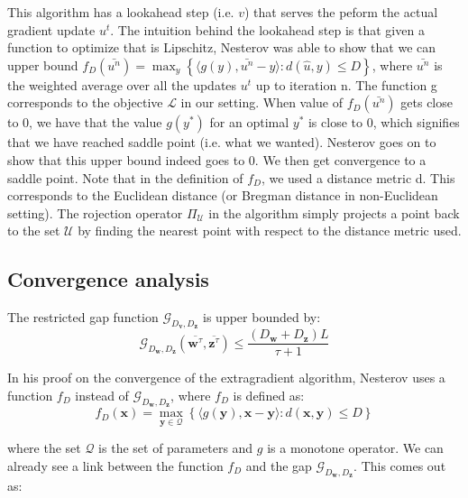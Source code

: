 \documentclass{article}
\renewcommand{\vec}{\mathbf}
\begin{document}
This algorithm has a lookahead step (i.e. $v$) that serves the peform the actual
gradient update $u^t$. The intuition behind the lookahead step is that given a
function to optimize that is Lipschitz, Nesterov was able to show that we can
upper bound $f_{D}(\bar{u^n}) = \max_y \left \{ \langle g(y),\bar{u^n} - y
\rangle : d(\hat{u},y) \leq D \right \}$, where $\bar{u^n}$ is the weighted
average over all the updates $u^t$ up to iteration n. The function g corresponds
to the objective $\mathcal{L}$ in our setting. When value of $f_D(\bar{u^n})$
gets close to 0, we have that the value $g(y^*)$ for an optimal $y^*$ is close
to 0, which signifies that we have reached saddle point (i.e. what we wanted).
Nesterov goes on to show that this upper bound indeed goes to 0. We then get
convergence to a saddle point. Note that in the definition of $f_D$, we used a
distance metric d. This corresponds to the Euclidean distance (or Bregman
distance in non-Euclidean setting). The rojection operator $\Pi_{\mathcal{U}}$
in the algorithm simply projects a point back to the set $\mathcal{U}$ by
finding the nearest point with respect to the distance metric used.

\subsection{Convergence analysis} The restricted gap function
$\mathcal{G}_{D_{\vec v}, D_{\vec z}}$ is upper bounded by:
\begin{equation} \mathcal{G}_{D_{\vec w}, D_{\vec z}}(\overline{\vec w^{\tau}},
\overline{\vec z^{\tau}}) \leq \frac{\left( D_{\vec w} + D_{\vec z} \right)
L}{\tau + 1}
\label{eq:ub}
\end{equation}

In his proof on the convergence of the extragradient algorithm, Nesterov uses a
function $f_D$ instead of $\mathcal{G}_{D_{\vec w}, D_{\vec z}}$, where $f_D$ is
defined as:
\begin{equation}
f_D(\vec x) = \max_{\vec y \in \mathcal{Q}} \left \{ \langle g(\vec y), \vec x -
\vec y \rangle : d(\vec x, \vec y) \leq D \right \}
\end{equation}

where the set $\mathcal{Q}$ is the set of parameters and $g$ is a monotone
operator. We can already see a link between the function $f_D$ and the gap
$\mathcal{G}_{D_{\vec w}, D_{\vec z}}$. This comes out as:
\end{document}
